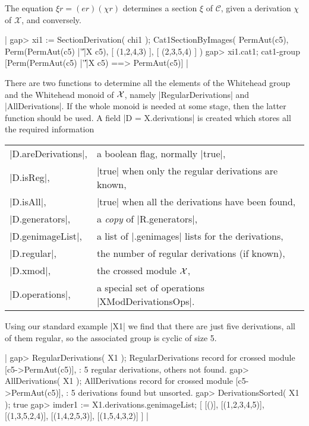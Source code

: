 The equation   $\xi r = (er)(\chi r)$   determines a section   
$\xi$  of  $\mathcal{C}$,  given a derivation  $\chi$  of
$\mathcal{X}$, and conversely.

|    gap> xi1 := SectionDerivation( chi1 );
    Cat1SectionByImages( PermAut(c5), Perm(PermAut(c5) |'\|'|X c5),
        [ (1,2,4,3) ], [ (2,3,5,4) ] )
    gap> xi1.cat1;
    cat1-group [Perm(PermAut(c5) |'\|'|X c5) ==> PermAut(c5)]  |

There are two functions to determine all the elements of the Whitehead group 
and the Whitehead monoid of ${\cal X}$,
namely  |RegularDerivations| and |AllDerivations|.  
If the whole monoid is needed at some stage, then the latter function 
should be used.  
A field  |D = X.derivations|  is created which stores all the required 
information\:

\begin{tabular}{ll}
|D.areDerivations|,  & a boolean flag, normally |true|,                    \\
|D.isReg|,           & |true| when only the regular derivations are known, \\
|D.isAll|,           & |true| when all the derivations have been found,    \\
|D.generators|,      & a \emph{copy} of |R.generators|,                    \\
|D.genimageList|,    & a list of |.genimages| lists for the derivations,   \\
|D.regular|,         & the number of regular derivations (if known),       \\
|D.xmod|,            & the crossed module ${\cal X}$,                      \\
|D.operations|,      & a special set of operations |XModDerivationsOps|.
\end{tabular}

Using our standard example |X1| we find that there are just five derivations,
all of them regular, so the associated group is cyclic of size 5.

|    gap> RegularDerivations( X1 );
    RegularDerivations record for crossed module [c5->PermAut(c5)],
    : 5 regular derivations, others not found.
    gap> AllDerivations( X1 );
    AllDerivations record for crossed module [c5->PermAut(c5)],
    : 5 derivations found but unsorted.
    gap> DerivationsSorted( X1 );
    true
    gap> imder1 := X1.derivations.genimageList;
    [ [()], [(1,2,3,4,5)], [(1,3,5,2,4)], [(1,4,2,5,3)], [(1,5,4,3,2)] ] |

